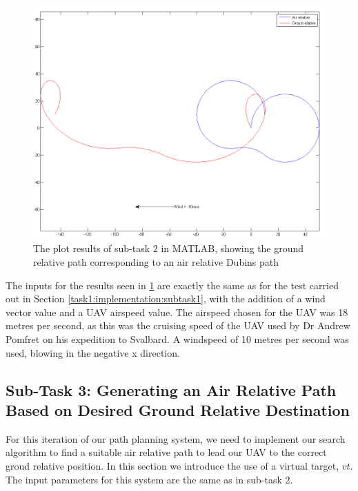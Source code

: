 \begin{figure}[htbp!] 
\centering    
\includegraphics[width=\textwidth]{PP2_Demo}
\caption[Task 2: Plotting the Effects of Wind on Dubins Paths in MATLAB]{The plot results of sub-task 2 in MATLAB, showing the ground relative path corresponding to an air relative Dubins path}
\label{fig:pp2demo}
\end{figure}

The inputs for the results seen in \ref{fig:pp2demo} are exactly the same as for the test carried out in Section \ref{task1:implementation:subtask1}, with the addition of a wind vector value and a UAV airspeed value. The airspeed chosen for the UAV was 18 metres per second, as this was the cruising speed of the UAV used by Dr Andrew Pomfret on his expedition to Svalbard. A windspeed of 10 metres per second was used, blowing in the negative x direction.

\subsection{Sub-Task 3: Generating an Air Relative Path Based on Desired Ground Relative Destination}
\label{task1:implementation:subtask3}

For this iteration of our path planning system, we need to implement our search algorithm to find a suitable air relative path to lead our UAV to the correct groud relative position. In this section we introduce the use of a virtual target, $vt$. The input parameters for this system are the same as in sub-task 2. 

